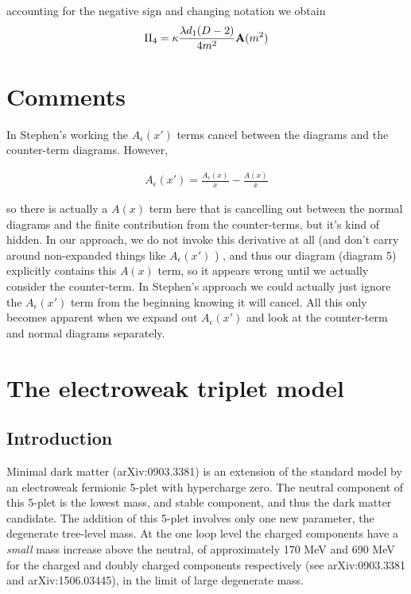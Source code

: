 \documentclass[11pt]{article}
\begin{document}
 accounting for the negative sign and changing notation we obtain
 \begin{align}
 \Pi_4 =  \kappa \frac{ \lambda d_1 (D-2)}{ 4 m^2} {\tt{\mathbf{A}}}(m^2) 
 \end{align}
 
 


 \section*{Comments}
 
 In Stephen's working the $A_{\epsilon}(x')$ terms cancel between the diagrams and the counter-term diagrams.  However,
 
 \begin{align*}
 A_{\epsilon}(x') = \frac{A_{\epsilon}(x)}{x}-\frac{A(x)}{x}
 \end{align*}
 
 so there is actually a $A(x)$ term here that is cancelling out between the normal diagrams and the finite contribution from the counter-terms, but it's kind of hidden.  In our approach, we do not invoke this derivative at all (and don't carry around non-expanded things like  $A_{\epsilon}(x')$ ) , and thus our diagram (diagram 5) explicitly contains this $A(x)$ term, so it appears wrong until we actually consider the counter-term.  In Stephen's approach we could actually just ignore the  $A_{\epsilon}(x')$  term from the beginning knowing it will cancel.  All this only becomes apparent when we expand out  $A_{\epsilon}(x')$ and look at the counter-term and normal diagrams separately.
 
 



\section{The electroweak triplet model}
\subsection{Introduction}

Minimal dark matter (arXiv:0903.3381)  is an extension of the standard model by an electroweak fermionic 5-plet with hypercharge zero.  The neutral component of this 5-plet is the lowest mass, and stable component, and thus the dark matter candidate.  The addition of this 5-plet involves only one new parameter, the degenerate tree-level mass.  At the one loop level the charged components have a \textit{small} mass increase above the neutral, of approximately 170 MeV and 690 MeV for the charged and doubly charged components respectively (see arXiv:0903.3381 and arXiv:1506.03445), in the limit of large degenerate mass.\\
\end{document}
